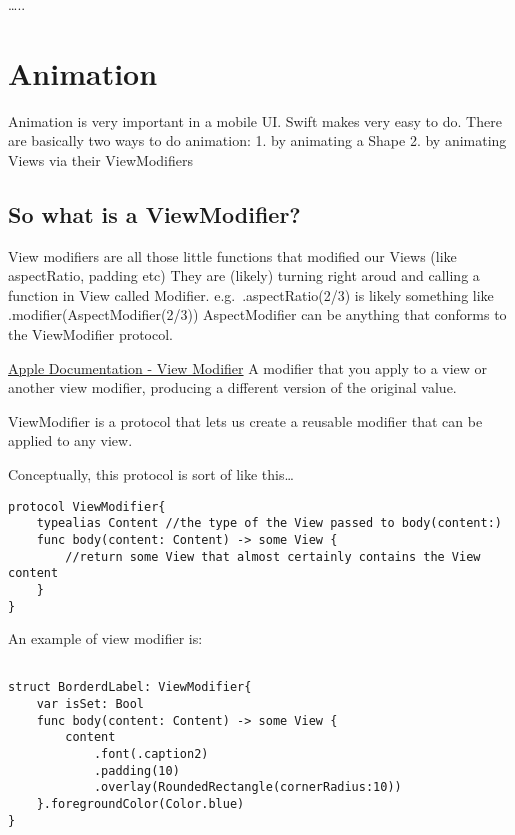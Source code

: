\documentclass[]{article}
\begin{document}
\ldots{}..

\hypertarget{animation}{%
\section{Animation}\label{animation}}

Animation is very important in a mobile UI. Swift makes very easy to do.
There are basically two ways to do animation: 1. by animating a Shape 2.
by animating Views via their ViewModifiers

\hypertarget{so-what-is-a-viewmodifier}{%
\subsection{So what is a
ViewModifier?}\label{so-what-is-a-viewmodifier}}

View modifiers are all those little functions that modified our Views
(like aspectRatio, padding etc) They are (likely) turning right aroud
and calling a function in View called Modifier. e.g.~.aspectRatio(2/3)
is likely something like .modifier(AspectModifier(2/3)) AspectModifier
can be anything that conforms to the ViewModifier protocol.

\href{https://developer.apple.com/documentation/swiftui/viewmodifier}{Apple
Documentation - View Modifier} A modifier that you apply to a view or
another view modifier, producing a different version of the original
value.

ViewModifier is a protocol that lets us create a reusable modifier that
can be applied to any view.

Conceptually, this protocol is sort of like this\ldots{}

\begin{verbatim}
protocol ViewModifier{
    typealias Content //the type of the View passed to body(content:)
    func body(content: Content) -> some View {
        //return some View that almost certainly contains the View content
    }
}
\end{verbatim}

An example of view modifier is:

\begin{verbatim}

struct BorderdLabel: ViewModifier{
    var isSet: Bool
    func body(content: Content) -> some View {
        content
            .font(.caption2)
            .padding(10)
            .overlay(RoundedRectangle(cornerRadius:10))
    }.foregroundColor(Color.blue)
}
\end{verbatim}
\end{document}
